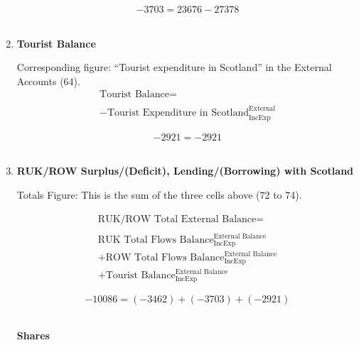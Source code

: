 \begin{enumerate}
\begin{equation} \nonumber
-3703 = 23676-27378
\end{equation}\\


\item \textbf {Tourist Balance}

Corresponding figure: “Tourist expenditure in Scotland” in the External Accounts (64).\\

\begin{equation}
\begin{split}
\text{Tourist Balance} =  \\ \\
-\text{Tourist Expenditure in Scotland}^\text{External}_\text{IncExp}
\end{split} \label{eq:2.5.78}
\end{equation}

\begin{equation} \nonumber
-2921 = -2921
\end{equation}\\


\item \textbf {RUK/ROW Surplus/(Deficit), Lending/(Borrowing) with Scotland}

Totals Figure: This is the sum of the three cells above (72 to 74).

\begin{equation}
\begin{split}
\text{RUK/ROW Total External Balance} =  \\ \\
\text{RUK Total Flows Balance}^\text{External Balance}_\text{IncExp}\\
+\text{ROW Total Flows Balance}^\text{External Balance}_\text{IncExp}\\
+\text{Tourist Balance}^\text{External Balance}_\text{IncExp}
\end{split} \label{eq:2.5.79}
\end{equation}

\begin{equation} \nonumber
-10086 = (-3462)+(-3703)+(-2921)
\end{equation}\\

\pagebreak

\begin{center}
\textbf{\LARGE Shares}
\end{center}


\end{enumerate}

